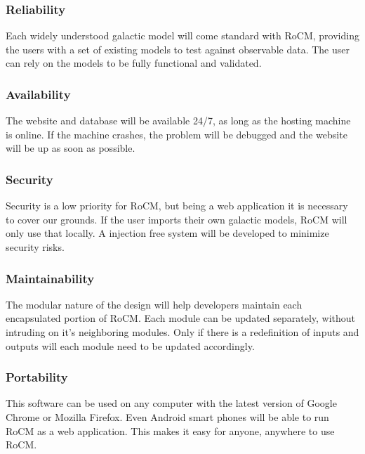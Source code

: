 \documentclass[titlepage]{article}
\begin{document}

\subsubsection{Reliability}
Each widely understood galactic model will come standard with RoCM, providing the users with a set of existing models to test against observable data. The user can rely on the models to be fully functional and validated.

\subsubsection{Availability}
The website and database will be available 24/7, as long as the hosting machine is online. If the machine crashes, the problem will be debugged and the website will be up as soon as possible.

\subsubsection{Security}
Security is a low priority for RoCM, but being a web application it is necessary to cover our grounds. If the user imports their own galactic models, RoCM will only use that locally. A injection free system will be developed to minimize security risks.

\subsubsection{Maintainability}
The modular nature of the design will help developers maintain each encapsulated portion of RoCM. Each module can be updated separately, without intruding on it's neighboring modules. Only if there is a redefinition of inputs and outputs will each module need to be updated accordingly.

\subsubsection{Portability}
This software can be used on any computer with the latest version of Google Chrome or Mozilla Firefox. Even Android smart phones will be able to run RoCM as a web application. This makes it easy for anyone, anywhere to use RoCM.
\end{document}
